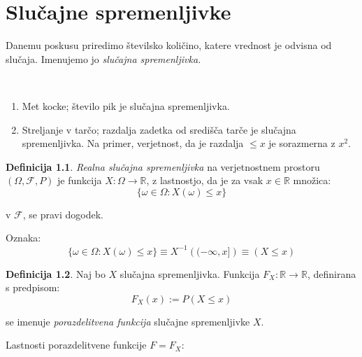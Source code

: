 \documentclass[12pt]{book}
\def\n{\noindent}
\theoremstyle{definition}
\newtheorem{definicija}{Definicija}
\theoremstyle{plain}
\theoremstyle{plain}
\theoremstyle{plain}
\theoremstyle{remark}
\begin{document}
\chapter{Slučajne spremenljivke}

Danemu poskusu priredimo številsko količino, katere vrednost je odvisna od slučaja. Imenujemo jo \emph{slučajna spremenljivka.}

\begin{zgled}
    ~

    \begin{enumerate} 
        \item Met kocke; število pik je slučajna spremenljivka.
        \item Streljanje v tarčo; razdalja zadetka od središča tarče je slučajna spremenljivka. 
        Na primer, verjetnost, da je razdalja $\leq x$ je sorazmerna z $x^2$.
    \end{enumerate}
\end{zgled}

\begin{definicija}
    \emph{Realna slučajna spremenljivka} na verjetnostnem prostoru $(\Omega, \mathcal{F}, P)$ je funkcija $X: \Omega \to \mathbb{R}$, z lastnostjo, da je za vsak $x \in \mathbb{R}$ množica:
    $$
    \{\omega \in \Omega: X(\omega) \leq x\}
    $$

    v $\mathcal{F}$, se pravi dogodek.
\end{definicija}

\n Oznaka: 
$$
\{\omega \in \Omega: X(\omega) \leq x\} \equiv X^{-1}\left((-\infty, x]\right) \equiv (X \leq x)
$$

\begin{definicija}
    Naj bo $X$ slučajna spremenljivka. Funkcija $F_X: \mathbb{R} \to \mathbb{R}$, definirana s predpisom: 
    $$
    F_X(x):=P(X \leq x)
    $$

    se imenuje \emph{porazdelitvena funkcija} slučajne spremenljivke $X$.
\end{definicija}

\newpage

\n Lastnosti porazdelitvene funkcije $F=F_X$:
\end{document}
